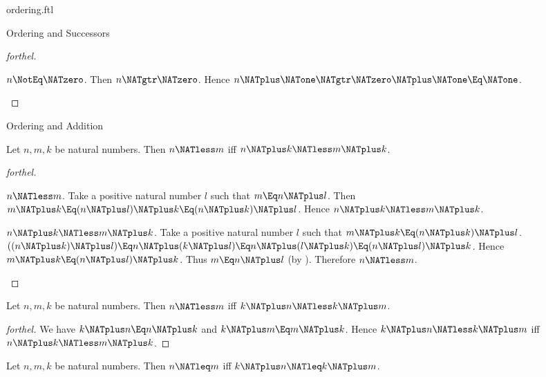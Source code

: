 \documentclass{stex}
\begin{document}
\begin{smodule}{ordering.ftl}
\begin{sfragment}{Ordering and Successors}
\begin{proof}[forthel]
    \begin{case}{$n \NotEq \NATzero$.}
      Then $n \NATgtr \NATzero$.
      Hence $n \NATplus \NATone \NATgtr \NATzero \NATplus \NATone \Eq \NATone$.
    \end{case}
  \end{proof}
\end{sfragment}

\begin{sfragment}{Ordering and Addition}


  \begin{proposition}[forthel,name=preservation of ordering under right-addition]
    Let $n, m, k$ be natural numbers.
    Then $n \NATless m$ iff $n \NATplus k \NATless m \NATplus k$.
  \end{proposition}
  \begin{proof}[forthel]
    \begin{case}{$n \NATless m$.}
      Take a positive natural number $l$ such that $m \Eq n \NATplus l$.
      Then $m \NATplus k
        \Eq (n \NATplus l) \NATplus k
        \Eq (n \NATplus k) \NATplus l$.
      Hence $n \NATplus k \NATless m \NATplus k$.
    \end{case}

    \begin{case}{$n \NATplus k \NATless m \NATplus k$.}
      Take a positive natural number $l$ such that $m \NATplus k \Eq (n \NATplus k) \NATplus l$.
      $((n \NATplus k) \NATplus l)
        \Eq n \NATplus (k \NATplus l)
        \Eq n \NATplus (l \NATplus k)
        \Eq (n \NATplus l) \NATplus k$.
      Hence $m \NATplus k \Eq (n \NATplus l) \NATplus k$.
      Thus $m \Eq n \NATplus l$ (by ).
      Therefore $n \NATless m$.
    \end{case}
  \end{proof}

  \begin{corollary}[forthel]
    Let $n, m, k$ be natural numbers.
    Then $n \NATless m$ iff $k \NATplus n \NATless k \NATplus m$.
  \end{corollary}
  \begin{proof}[forthel]
    We have $k \NATplus n \Eq n \NATplus k$ and $k \NATplus m \Eq m \NATplus k$.
    Hence $k \NATplus n \NATless k \NATplus m$ iff $n \NATplus k \NATless m \NATplus k$.
  \end{proof}

  \begin{corollary}[forthel]
    Let $n, m, k$ be natural numbers.
    Then $n \NATleq m$ iff $k \NATplus n \NATleq k \NATplus m$.
  \end{corollary}


\end{sfragment}
\end{smodule}
\end{document}
